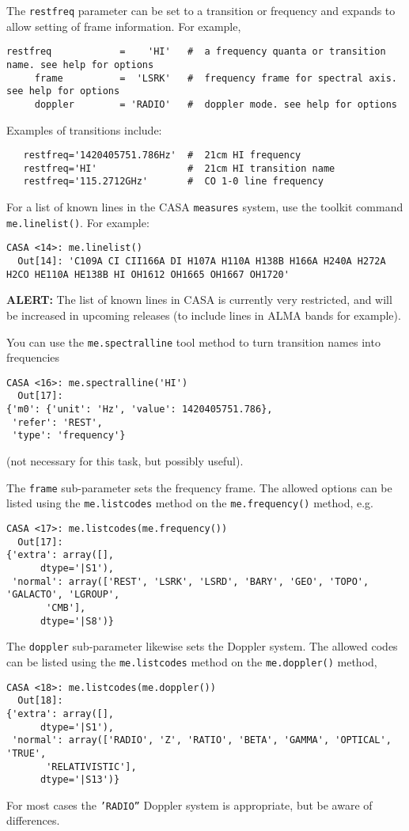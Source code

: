 The {\tt restfreq} parameter can be set to a transition or frequency
and expands to allow setting of frame information.  For example,
\small
\begin{verbatim}
restfreq            =    'HI'   #  a frequency quanta or transition name. see help for options
     frame          =  'LSRK'   #  frequency frame for spectral axis. see help for options
     doppler        = 'RADIO'   #  doppler mode. see help for options
\end{verbatim}
\normalsize
Examples of transitions include:
\small
\begin{verbatim}
   restfreq='1420405751.786Hz'  #  21cm HI frequency
   restfreq='HI'                #  21cm HI transition name
   restfreq='115.2712GHz'       #  CO 1-0 line frequency
\end{verbatim}
\normalsize
For a list of known lines in the CASA {\tt measures} system, use the
toolkit command {\tt me.linelist()}.  For example:
\small
\begin{verbatim}
CASA <14>: me.linelist()
  Out[14]: 'C109A CI CII166A DI H107A H110A H138B H166A H240A H272A H2CO HE110A HE138B HI OH1612 OH1665 OH1667 OH1720'
\end{verbatim}
\normalsize
{\bf ALERT:} The list of known lines in CASA is currently very
restricted, and will be increased in upcoming releases (to include lines
in ALMA bands for example).

You can use the {\tt me.spectralline} tool method to turn transition names into
frequencies 
\small
\begin{verbatim}
CASA <16>: me.spectralline('HI')
  Out[17]: 
{'m0': {'unit': 'Hz', 'value': 1420405751.786},
 'refer': 'REST',
 'type': 'frequency'}
\end{verbatim}
\normalsize
(not necessary for this task, but possibly useful).

The {\tt frame} sub-parameter sets the frequency frame.  The allowed
options can be listed using the {\tt me.listcodes} method on the
{\tt me.frequency()} method, e.g.
\small
\begin{verbatim}
CASA <17>: me.listcodes(me.frequency())
  Out[17]: 
{'extra': array([], 
      dtype='|S1'),
 'normal': array(['REST', 'LSRK', 'LSRD', 'BARY', 'GEO', 'TOPO', 'GALACTO', 'LGROUP',
       'CMB'], 
      dtype='|S8')}
\end{verbatim}
\normalsize

The {\tt doppler} sub-parameter likewise sets the Doppler system.  The
allowed codes can be listed using the {\tt me.listcodes} method on the
{\tt me.doppler()} method,
\small
\begin{verbatim}
CASA <18>: me.listcodes(me.doppler())
  Out[18]: 
{'extra': array([], 
      dtype='|S1'),
 'normal': array(['RADIO', 'Z', 'RATIO', 'BETA', 'GAMMA', 'OPTICAL', 'TRUE',
       'RELATIVISTIC'], 
      dtype='|S13')}
\end{verbatim}
\normalsize
For most cases the {\tt 'RADIO''} Doppler system is appropriate, but
be aware of differences.

